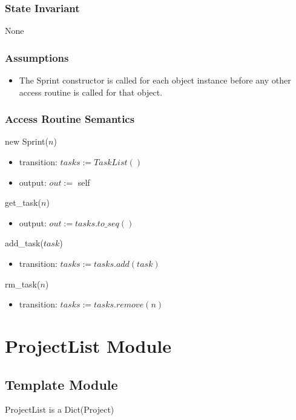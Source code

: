 \documentclass[12pt, titlepage]{article}
\begin{document}
\subsubsection*{State Invariant}
None

\subsubsection*{Assumptions}
\begin{itemize}
  \item The Sprint constructor is called for each object instance before any other access routine is called for that object.
\end{itemize}

\subsubsection*{Access Routine Semantics}
\noindent new Sprint($n$)
\begin{itemize}
    \item transition: $tasks := TaskList()$
    \item output: $out :=$ self
\end{itemize}

\noindent get\_task($n$)
\begin{itemize}
    \item output: $out := tasks.to\_seq()$
\end{itemize}

\noindent add\_task($task$)
\begin{itemize}
    \item transition: $tasks := tasks.add(task)$
\end{itemize}

\noindent rm\_task($n$)
\begin{itemize}
    \item transition: $tasks := tasks.remove(n)$
\end{itemize}

\newpage

\section* {ProjectList Module}

\subsection*{Template Module}
ProjectList is a Dict(Project)
\end{document}
